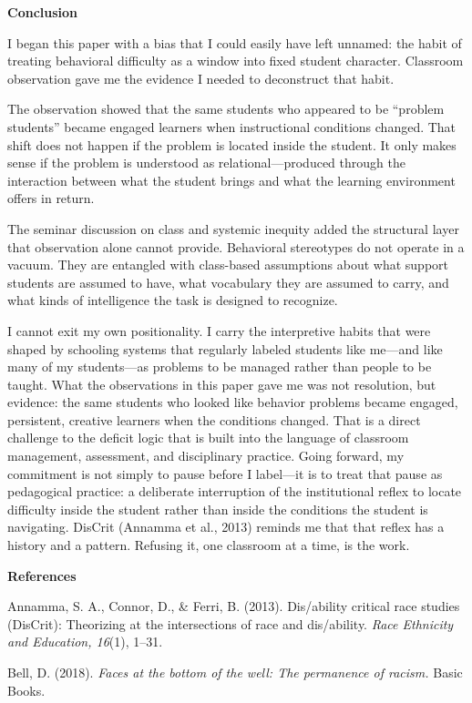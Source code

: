 \documentclass[12pt]{article}
\newcommand{\apaheading}[1]{\begin{center}\textbf{#1}\end{center}}
\newcommand{\reference}[1]{\noindent\hangindent=0.5in\hangafter=1 #1\par}
\begin{document}
\apaheading{Conclusion}

I began this paper with a bias that I could easily have left unnamed: the habit of treating behavioral difficulty as a window into fixed student character. Classroom observation gave me the evidence I needed to deconstruct that habit.

The observation showed that the same students who appeared to be ``problem students'' became engaged learners when instructional conditions changed. That shift does not happen if the problem is located inside the student. It only makes sense if the problem is understood as relational---produced through the interaction between what the student brings and what the learning environment offers in return.

The seminar discussion on class and systemic inequity added the structural layer that observation alone cannot provide. Behavioral stereotypes do not operate in a vacuum. They are entangled with class-based assumptions about what support students are assumed to have, what vocabulary they are assumed to carry, and what kinds of intelligence the task is designed to recognize.

I cannot exit my own positionality. I carry the interpretive habits that were shaped by schooling systems that regularly labeled students like me---and like many of my students---as problems to be managed rather than people to be taught. What the observations in this paper gave me was not resolution, but evidence: the same students who looked like behavior problems became engaged, persistent, creative learners when the conditions changed. That is a direct challenge to the deficit logic that is built into the language of classroom management, assessment, and disciplinary practice. Going forward, my commitment is not simply to pause before I label---it is to treat that pause as pedagogical practice: a deliberate interruption of the institutional reflex to locate difficulty inside the student rather than inside the conditions the student is navigating. DisCrit (Annamma et al., 2013) reminds me that that reflex has a history and a pattern. Refusing it, one classroom at a time, is the work.

\newpage
\apaheading{References}

\reference{Annamma, S. A., Connor, D., \& Ferri, B. (2013). Dis/ability critical race studies (DisCrit): Theorizing at the intersections of race and dis/ability. \textit{Race Ethnicity and Education, 16}(1), 1--31.}

\reference{Bell, D. (2018). \textit{Faces at the bottom of the well: The permanence of racism.} Basic Books.}
\end{document}
